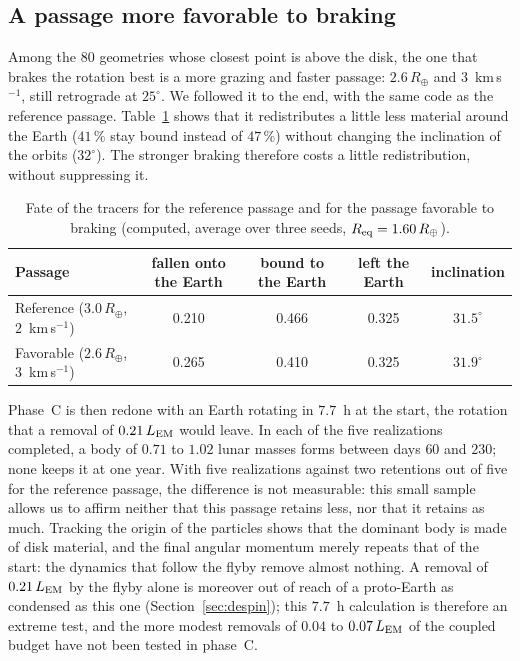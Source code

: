 \documentclass[11pt,a4paper]{article}
\newcommand{\Rt}{\ensuremath{R_\oplus}}
\newcommand{\LEM}{\ensuremath{L_{\rm EM}}}
\newcommand{\Req}{\ensuremath{R_{\rm eq}}}
\begin{document}
\subsection{A passage more favorable to braking}
\label{sec:best}

Among the $80$ geometries whose closest point is above the disk, the one that brakes the rotation best is a more grazing and faster passage: $2.6\,\Rt$ and $3$~km\,s$^{-1}$, still retrograde at $25^\circ$. We followed it to the end, with the same code as the reference passage. Table~\ref{tab:bestB} shows that it redistributes a little less material around the Earth ($41\,\%$ stay bound instead of $47\,\%$) without changing the inclination of the orbits ($32^\circ$). The stronger braking therefore costs a little redistribution, without suppressing it.

\begin{table}[htbp]
\centering
\caption{Fate of the tracers for the reference passage and for the passage favorable to braking (computed, average over three seeds, $\Req=1.60\,\Rt$).\label{tab:bestB}}
\small
\begin{tabular}{lcccc}
\toprule
Passage & fallen onto the Earth & bound to the Earth & left the Earth & inclination \\
\midrule
Reference ($3.0\,\Rt$, $2$~km\,s$^{-1}$) & 0.210 & 0.466 & 0.325 & $31.5^\circ$ \\
Favorable ($2.6\,\Rt$, $3$~km\,s$^{-1}$) & 0.265 & 0.410 & 0.325 & $31.9^\circ$ \\
\bottomrule
\end{tabular}
\end{table}

Phase~C is then redone with an Earth rotating in $7.7$~h at the start, the rotation that a removal of $0.21\,\LEM$ would leave. In each of the five realizations completed, a body of $0.71$ to $1.02$ lunar masses forms between days $60$ and $230$; none keeps it at one year. With five realizations against two retentions out of five for the reference passage, the difference is not measurable: this small sample allows us to affirm neither that this passage retains less, nor that it retains as much. Tracking the origin of the particles shows that the dominant body is made of disk material, and the final angular momentum merely repeats that of the start: the dynamics that follow the flyby remove almost nothing. A removal of $0.21\,\LEM$ by the flyby alone is moreover out of reach of a proto-Earth as condensed as this one (Section~\ref{sec:despin}); this $7.7$~h calculation is therefore an extreme test, and the more modest removals of $0.04$ to $0.07\,\LEM$ of the coupled budget have not been tested in phase~C.
\end{document}
